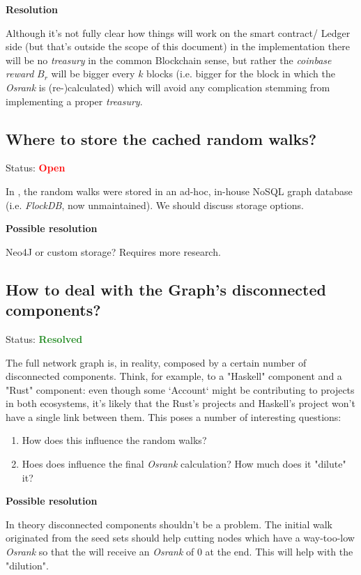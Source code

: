 \documentclass{article}
\begin{document}
\textbf{Resolution}

Although it's not fully clear how things will work on the smart contract/
Ledger side (but that's outside the scope of this document) in the
implementation there will be no \textit{treasury} in the common Blockchain
sense, but rather the \textit{coinbase reward} $B_r$ will be bigger every
$k$ blocks (i.e. bigger for the block in which the \textit{Osrank}
is (re-)calculated) which will avoid any complication stemming from
implementing a proper \textit{treasury}.

\subsection{Where to store the cached random walks?}

Status: \textcolor{red}{\textbf{Open}}

In \citep{bahmani10pagerank}, the random walks were stored in an ad-hoc, in-house
NoSQL graph database (i.e. \textit{FlockDB}, now unmaintained). We should discuss
storage options.

\textbf{Possible resolution}

Neo4J or custom storage? Requires more research.

\subsection{How to deal with the Graph's disconnected components?}

Status: \textcolor{ForestGreen}{\textbf{Resolved}}

The full network graph is, in reality, composed by a certain number of
disconnected components. Think, for example, to a "Haskell" component and a
"Rust" component: even though some `Account` might be contributing to projects
in both ecosystems, it's likely that the Rust's projects and Haskell's project
won't have a single link between them. This poses a number of interesting questions:

\begin{enumerate}
\item How does this influence the random walks?
\item Hoes does influence the final \textit{Osrank} calculation? How much
      does it "dilute" it?
\end{enumerate}

\textbf{Possible resolution}

In theory disconnected components shouldn't be a problem. The initial
walk originated from the seed sets should help cutting nodes which have a
way-too-low \textit{Osrank} so that the will receive an \textit{Osrank} of
$0$ at the end. This will help with the "dilution".
\end{document}
